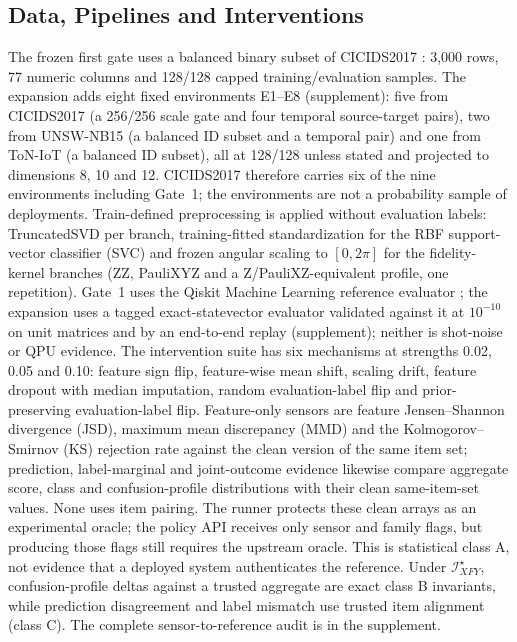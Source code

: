 \documentclass[10pt,journal,compsoc]{IEEEtran}
\newcommand{\IXFYs}{\mathcal I_{XFY}^{\star}}
\begin{document}
\subsection{Data, Pipelines and Interventions}

The frozen first gate uses a balanced binary subset of CICIDS2017
\cite{Sharafaldin2018}: 3,000 rows, 77 numeric columns and 128/128 capped
training/evaluation samples. The expansion adds eight fixed environments
E1--E8 (supplement): five from CICIDS2017 (a 256/256 scale gate and four
temporal source-target pairs), two from UNSW-NB15 \cite{Moustafa2015} (a
balanced ID subset and a temporal pair) and one from ToN-IoT
\cite{Alsaedi2020} (a balanced ID subset), all at 128/128 unless stated and
projected to dimensions 8, 10 and 12. CICIDS2017 therefore carries six of
the nine environments including Gate~1; the environments are not a
probability sample of deployments. Train-defined preprocessing is applied
without evaluation labels: TruncatedSVD per branch, training-fitted
standardization for the RBF support-vector classifier (SVC) and frozen angular
scaling to $[0,2\pi]$ for the fidelity-kernel branches (ZZ, PauliXYZ and a
Z/PauliXZ-equivalent profile, one repetition). Gate~1 uses the Qiskit Machine
Learning reference evaluator \cite{JavadiAbhari2024}; the expansion uses a
tagged exact-statevector evaluator validated against it at $10^{-10}$ on unit
matrices and by an end-to-end replay (supplement); neither is shot-noise or
QPU evidence. The intervention suite has six mechanisms at strengths 0.02,
0.05 and 0.10: feature sign flip, feature-wise mean shift, scaling drift,
feature dropout with median imputation, random evaluation-label flip and
prior-preserving evaluation-label flip. Feature-only sensors are feature
Jensen--Shannon divergence (JSD), maximum mean discrepancy (MMD) and the
Kolmogorov--Smirnov (KS) rejection rate against the clean version of the same
item set; prediction, label-marginal and joint-outcome evidence likewise
compare aggregate score, class and confusion-profile distributions with
their clean same-item-set values. None uses item pairing. The runner protects
these clean arrays as an experimental oracle; the policy API receives only
sensor and family flags, but producing those flags still requires the upstream
oracle. This is statistical class A, not evidence that a deployed system
authenticates the reference. Under $\IXFYs$, confusion-profile deltas against
a trusted aggregate are exact class B invariants, while prediction
disagreement and label mismatch use trusted item alignment (class C). The
complete sensor-to-reference audit is in the supplement.
\end{document}
